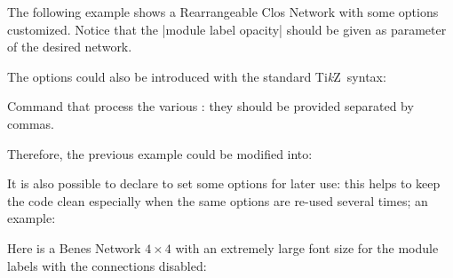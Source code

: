 \documentclass{ltxdoc}
\newcommand\Tikz{Ti\textit kZ}
\begin{document}
The following example shows a Rearrangeable Clos Network with some options customized. Notice that the |module label opacity| should be given as parameter of the desired network.

\begin{codeexample}[]
\begin{tikzpicture}[N=9,r1=3,M=9,r3=3]
    \node[module size=0.5cm,pin length factor=0.5,
        module ysep=1, module xsep=1.25,
        clos rear={module label opacity=0}] {};
\end{tikzpicture}
\end{codeexample}

The options could also be introduced with the standard \Tikz\ syntax:
\begin{command}{{\tikzset}}
    Command that process the various : they should be provided separated by commas.
\end{command}

Therefore, the previous example could be modified into:
\begin{codeexample}[]
\tikzset{module size=0.5cm,pin length factor=0.5,
         module ysep=1, module xsep=1.25,}
\begin{tikzpicture}[N=9,r1=3,M=9,r3=3]
    \node[clos rear={module label opacity=0}] {};
\end{tikzpicture}
\end{codeexample}

It is also possible to declare  to set some options for later use: this helps to keep the code clean especially when the same options are re-used several times; an example:
\begin{codeexample}
\tikzset{module size definition, 
 P=16,
}
\begin{tikzpicture}
    \node[benes] {};
\end{tikzpicture}
\end{codeexample}

Here is a Benes Network $4 \times 4$ with an extremely large font size for the module labels with the connections disabled:
\begin{codeexample}[]
\tikzset{my style, P=4, 
 module font=\huge\slshape, 
 connections disabled=true
}
\end{codeexample}
\pagebreak
\end{document}
